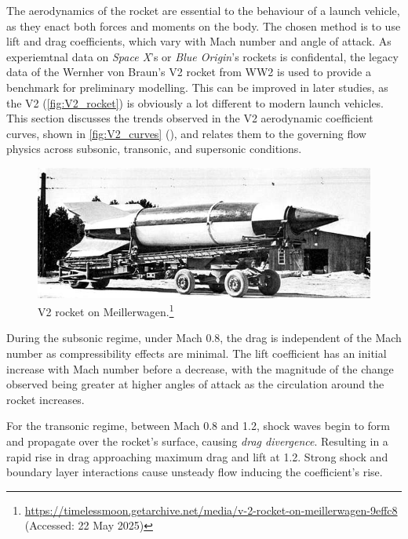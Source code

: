 The aerodynamics of the rocket are essential to the behaviour of a launch vehicle, as they enact both forces and moments on the body. The chosen method is to use lift and drag coefficients, which vary with Mach number and angle of attack. As experiemtnal data on \textit{Space X}'s or \textit{Blue Origin}'s rockets is confidental, the legacy data of the Wernher von Braun's V2 rocket from WW2 is used to provide a benchmark for preliminary modelling. This can be improved in later studies, as the V2 (\autoref{fig:V2_rocket}) is obviously a lot different to modern launch vehicles. This section discusses the trends observed in the V2 aerodynamic coefficient curves, shown in \autoref{fig:V2_curves} (\cite{sutton_rocket_2016}), and relates them to the governing flow physics across subsonic, transonic, and supersonic conditions.


\begin{figure}[H]
    \centering
    \includegraphics[width=0.75\linewidth]{figures/LiteratureStudy/V2_image.jpg}
    \caption{V2 rocket on Meillerwagen.\footnote{\url{https://timelessmoon.getarchive.net/media/v-2-rocket-on-meillerwagen-9effc8} (Accessed: 22 May 2025)}}
    \label{fig:V2_rocket}
\end{figure}

During the subsonic regime, under Mach 0.8, the drag is independent of the Mach number as compressibility effects are minimal. The lift coefficient has an initial increase with Mach number before a decrease, with the magnitude of the change observed being greater at higher angles of attack as the circulation around the rocket increases.

For the transonic regime, between Mach 0.8 and 1.2, shock waves begin to form and propagate over the rocket's surface, causing \textit{drag divergence}. Resulting in a rapid rise in drag approaching maximum drag and lift at 1.2. Strong shock and boundary layer interactions cause unsteady flow inducing the coefficient's rise.

